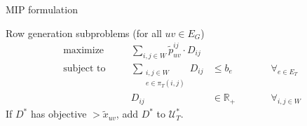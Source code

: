 \documentclass{beamer}
\begin{document}
\begin{frame}{MIP formulation}
{\begin{textblock}{1}
\begin{alertblock}{Row generation subproblems (for all $uv \in E_G$)}
                    \begin{alignat*}{5}
                        \text{maximize}\quad && \sum_{i,j \in W} \tilde p_{uv}^{ij} \cdot D_{ij} &&& \\
                        \text{subject to}\quad && \sum_{\substack{i,j \in W\\e \in \pi_T(i,j)}} D_{ij} &\le b_e &&\qquad \forall_{e \in E_T} \\
                        && D_{ij} &\in \mathbb{R}_+ &&\qquad \forall_{i,j \in W}
                    \end{alignat*}
                    If $D^*$ has objective $> \tilde x_{uv}$, add $D^*$ to $\mathcal U_T^*$.
                \end{alertblock}
            \end{textblock}%
        }%
    \end{frame}
\end{document}
